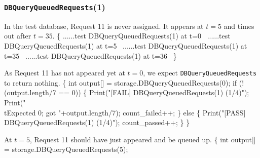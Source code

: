 \documentclass{article}
\def\nwendcode{\endtrivlist \endgroup}
\let\nwdocspar=\par
\begin{document}
\subsubsection{{\tt{}DBQueryQueuedRequests}(1)}
In the test database, Request 11 is never assigned. It appears
at $t=5$ and times out after $t=35$.
\nwenddocs{}\endmoddef{}
\{
  \LA{}......test \code{}DBQueryQueuedRequests\edoc{}(1) at t=0~{\nwtagstyle{}}\RA{}
  \LA{}......test \code{}DBQueryQueuedRequests\edoc{}(1) at t=5~{\nwtagstyle{}}\RA{}
  \LA{}......test \code{}DBQueryQueuedRequests\edoc{}(1) at t=35~{\nwtagstyle{}}\RA{}
  \LA{}......test \code{}DBQueryQueuedRequests\edoc{}(1) at t=36~{\nwtagstyle{}}\RA{}
\}
\nwendcode{}\nwdocspar
As Request 11 has not appeared yet at $t=0$, we expect
{\tt{}DBQueryQueuedRequests} to return nothing.
\nwenddocs{}\endmoddef{}
\{
  int output[] = storage.DBQueryQueuedRequests(0);
  if (!(output.length/7 == 0)) \{
    Print("[FAIL] DBQueryQueuedRequests(1) (1/4)");
    Print("\\tExpected 0; got "+output.length/7);
    count_failed++;
  \} else \{
    Print("[PASS] DBQueryQueuedRequests(1) (1/4)");
    count_passed++;
  \}
\}
\nwendcode{}\nwdocspar
At $t=5$, Request 11 should have just appeared and be queued up.
\nwenddocs{}\endmoddef{}
\{
  int output[] = storage.DBQueryQueuedRequests(5);
\end{document}

